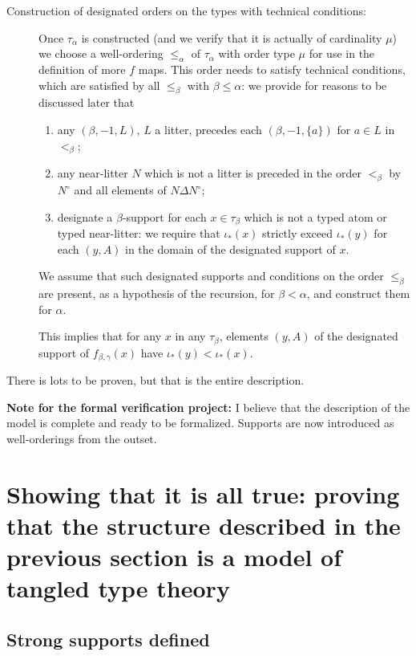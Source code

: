 \documentclass[112pt]{article}
\begin{document}
\begin{description}
\item[Construction of designated orders on the types with technical conditions:]  Once $\tau_\alpha$ is constructed (and we verify that it is actually of cardinality $\mu$) we choose a well-ordering $\leq_\alpha$ of $\tau_\alpha$ with order type $\mu$ for use in the definition of more $f$ maps.  This order needs to satisfy technical conditions, which are satisfied by all $\leq_\beta$ with $\beta\leq\alpha$:  we provide for reasons to be discussed later that
\begin{enumerate}
\item any $(\beta,-1,L)$, $L$ a litter, precedes each $(\beta,-1,\{a\})$ for $a \in L$ in $<_\beta$;  \item any near-litter $N$ which is not a litter is preceded in the order $<_\beta$ by $N^\circ$  and all elements of $N\Delta N^\circ$; \item designate a $\beta$-support for each $x \in \tau_\beta$ which is not a typed atom or typed near-litter:  we require that $\iota_*(x)$ strictly exceed $\iota_*(y)$ for each $(y,A)$ in the domain of the designated support of $x$.\end{enumerate}  We assume that such designated supports and conditions on the order $\leq_\beta$ are present, as a hypothesis of the recursion, for $\beta<\alpha$, and construct them for $\alpha$.

This implies that for any $x$ in any $\tau_\beta$, elements $(y,A)$ of the designated support of $f_{\beta,\gamma}(x)$  have $\iota_*(y) < \iota_*(x)$.
\end{description}
There is lots to be proven, but that is the entire description.


{\bf Note for the formal verification project:}  I believe that the description of the model is complete and ready to be formalized.   Supports are now introduced as well-orderings from the outset.


\newpage

\section{Showing that it is all true:  proving that the structure described in the previous section is a model of tangled type theory}

\subsection{Strong supports defined}
\end{document}
